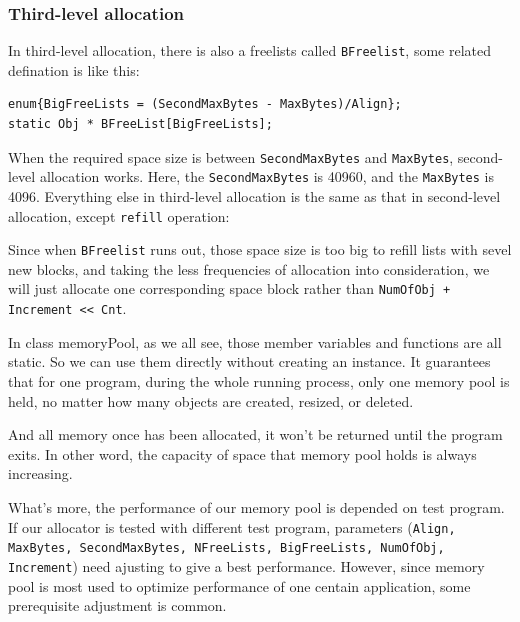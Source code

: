 \documentclass{article}
\begin{document}
\subsubsection{Third-level allocation}
In third-level allocation, there is also a freelists called \texttt{BFreelist}, some related defination is like this:
\begin{lstlisting}
enum{BigFreeLists = (SecondMaxBytes - MaxBytes)/Align};
static Obj * BFreeList[BigFreeLists];
\end{lstlisting}

When the required space size is between \texttt{SecondMaxBytes} and \texttt{MaxBytes}, second-level allocation works. Here, the \texttt{SecondMaxBytes} is 40960, and the \texttt{MaxBytes} is 4096. Everything else in third-level allocation is the same as that in second-level allocation, except \texttt{refill} operation:

Since when \texttt{BFreelist} runs out, those space size is too big to refill lists with sevel new blocks, and taking the less frequencies of allocation into consideration, we will just allocate one corresponding space block rather than \texttt{NumOfObj + Increment << Cnt}.

\vspace{1cm}

In class memoryPool, as we all see, those member variables and functions are all static. So we can use them directly without creating an instance. It guarantees that for one program, during the whole running process, only one memory pool is held, no matter how many objects are created, resized, or deleted. 

And all memory once has been allocated, it won't be returned until the program exits. In other word, the capacity of space that memory pool holds is always increasing.

What's more, the performance of our memory pool is depended on test program. If our allocator is tested with different test program, parameters (\texttt{Align, MaxBytes, SecondMaxBytes, NFreeLists, BigFreeLists, NumOfObj, Increment}) need ajusting to give a best performance. However, since memory pool is most used to optimize performance of one centain application, some prerequisite adjustment is common.
\end{document}
